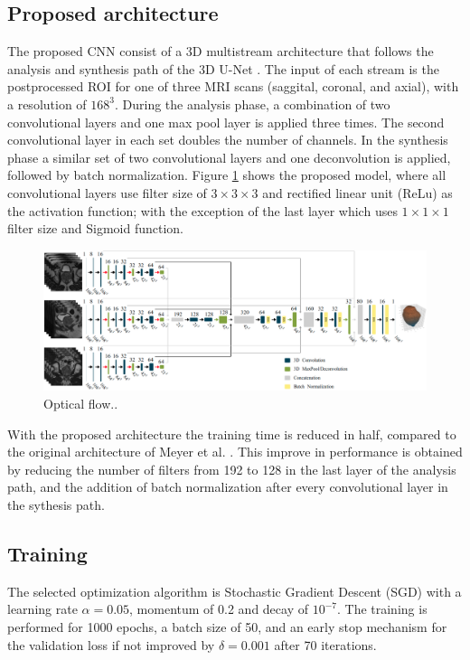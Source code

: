 \subsection{Proposed architecture}
The proposed CNN consist of a 3D multistream architecture that follows the analysis
and synthesis path of the 3D U-Net \cite{cciccek20163d}. The input of each stream is
the postprocessed ROI for one of three MRI scans (saggital, coronal, and axial), 
with a resolution of $168^3$. During the analysis phase, a combination
of two convolutional layers and one max pool layer is applied three times. The second 
convolutional layer in each set doubles the number of channels. 
In the synthesis phase a similar set of two convolutional layers and
one deconvolution is applied, followed by batch normalization.
Figure \ref{fig:nn} shows the proposed model, where 
all convolutional layers use filter size of $3 \times 3 \times 3$ and
rectified linear unit (ReLu) as the activation function; with the exception
of the last layer which uses  $1 \times 1 \times 1$ filter size and Sigmoid function. 
\begin{figure}[h]
    \centering
    \includegraphics[totalheight=.3\textheight]{imgs/methodology/NN.png}
    \caption{Optical flow..}
    \label{fig:nn}
\end{figure}

With the proposed architecture the training time is reduced in half, compared
to the original architecture of Meyer et al. \cite{anneke}. This
improve in performance is obtained by  reducing the number of filters 
from 192 to 128 in the last layer of the analysis path, and
the addition of batch normalization after every convolutional layer 
in the sythesis path.

\subsection{Training}
\label{subsec:training}
The selected optimization algorithm is Stochastic Gradient Descent (SGD) with a
learning rate $\alpha = 0.05$, momentum of 0.2 and decay of $10^{-7}$. The training is performed
for 1000 epochs, a batch size of 50, and an early stop mechanism for the validation
loss if not improved by $\delta = 0.001$ after 70 iterations. 

